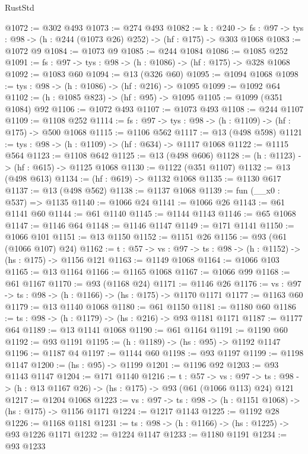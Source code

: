 \begin{lexlean}{RustStd}
\begin{coremodule}
@1072 := @302 @493
@1073 := @274 @493
@1082 := {k : @240} ->
  {fs : @97} -> {tys : @98} -> (h : @244 (@1073 @26) @252) -> (hf : @175) -> @303 @1068
@1083 := @1072 @9
@1084 := @1073 @9
@1085 := @244 @1084
@1086 := @1085 @252
@1091 := {fs : @97} -> {tys : @98} -> (h : @1086) -> (hf : @175) -> @328 @1068
@1092 := @1083 @60
@1094 := @13 (@326 @60)
@1095 := @1094 @1068
@1098 := {tys : @98} -> (h : @1086) -> (hf : @216) -> @1095
@1099 := @1092 @64
@1102 := (h : @1085 @823) -> (hf : @95) -> @1095
@1105 := @1099 (@351 @1084) @92
@1106 := @1072 @493
@1107 := @1073 @493
@1108 := @244 @1107
@1109 := @1108 @252
@1114 := {fs : @97} -> {tys : @98} -> (h : @1109) -> (hf : @175) -> @500 @1068
@1115 := @1106 @562
@1117 := @13 (@498 @598)
@1121 := {tys : @98} -> (h : @1109) -> (hf : @634) -> @1117 @1068
@1122 := @1115 @564
@1123 := @1108 @642
@1125 := @13 (@498 @606)
@1128 := (h : @1123) -> (hf : @615) -> @1125 @1068
@1130 := @1122 (@351 @1107)
@1132 := @13 (@498 @613)
@1134 := (hf : @619) -> @1132 @1068
@1135 := @1130 @617
@1137 := @13 (@498 @562)
@1138 := @1137 @1068
@1139 := fun (__x0 : @537) => @1135
@1140 := @1066 @24
@1141 := @1066 @26
@1143 := @61 @1141 @60
@1144 := @61 @1140
@1145 := @1144 @1143
@1146 := @65 @1068
@1147 := @1146 @64
@1148 := @1146 @1147
@1149 := @171 @1141
@1150 := @1066 @101
@1151 := @13 @1150
@1152 := @1151 @26
@1156 := @93 (@61 (@1066 @107) @24)
@1162 := {t : @57} -> {vs : @97} -> {ts : @98} -> (h : @1152) -> (hs : @175) -> @1156 @121
@1163 := @1149 @1068
@1164 := @1066 @103
@1165 := @13 @1164
@1166 := @1165 @1068
@1167 := @1066 @99
@1168 := @61 @1167
@1170 := @93 (@1168 @24)
@1171 := @1146 @26
@1176 := {vs : @97} -> {ts : @98} -> (h : @1166) -> (hs : @175) -> @1170 @1171
@1177 := @1163 @60
@1179 := @13 @1140 @1068
@1180 := @61 @1150
@1181 := @1180 @60
@1186 := {ts : @98} -> (h : @1179) -> (hs : @216) -> @93 @1181 @1171
@1187 := @1177 @64
@1189 := @13 @1141 @1068
@1190 := @61 @1164
@1191 := @1190 @60
@1192 := @93 @1191
@1195 := (h : @1189) -> (hs : @95) -> @1192 @1147
@1196 := @1187 @4
@1197 := @1144 @60
@1198 := @93 @1197
@1199 := @1198 @1147
@1200 := (hs : @95) -> @1199
@1201 := @1196 @92
@1203 := @93 @1143 @1147
@1204 := @171 @1140
@1216 := {t : @57} ->
  {vs : @97} -> {ts : @98} -> (h : @13 @1167 @26) -> (hs : @175) -> @93 (@61 (@1066 @113) @24) @121
@1217 := @1204 @1068
@1223 := {vs : @97} -> {ts : @98} -> (h : @1151 @1068) -> (hs : @175) -> @1156 @1171
@1224 := @1217 @1143
@1225 := @1192 @28
@1226 := @1168 @1181
@1231 := {ts : @98} -> (h : @1166) -> (hs : @1225) -> @93 @1226 @1171
@1232 := @1224 @1147
@1233 := @1180 @1191
@1234 := @93 @1233

\end{coremodule}
\end{lexlean}
